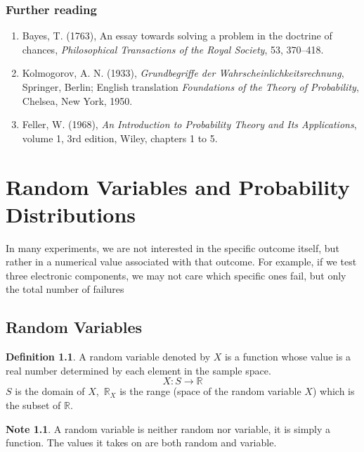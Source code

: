 \documentclass[12pt,a4paper]{report}
\theoremstyle{definition}
\newtheorem{definition}[thm]{Definition}
\newtheorem{note}[thm]{Note}
\theoremstyle{plain}
\theoremstyle{definition}
\begin{document}
\subsection*{Further reading}
\begin{enumerate}
\item Bayes, T. (1763), An essay towards solving a problem in the doctrine of chances,
\emph{Philosophical Transactions of the Royal Society}, 53, 370--418.
\item Kolmogorov, A. N. (1933), \emph{Grundbegriffe der Wahrscheinlichkeitsrechnung},
Springer, Berlin; English translation \emph{Foundations of the Theory of Probability},
Chelsea, New York, 1950.
\item Feller, W. (1968), \emph{An Introduction to Probability Theory and Its
Applications}, volume 1, 3rd edition, Wiley, chapters 1 to 5.
\end{enumerate}


\chapter{Random Variables and Probability Distributions}
\label{ch:randomvariables}
\vspace{-15pt}
In many experiments, we are not interested in the specific outcome itself, but rather in a numerical value associated with that outcome. For example, if we test three electronic components, we may not care which specific ones fail, but only the total number of failures


\section{Random Variables}
\begin{definition}
A random variable denoted by $X$ is a function whose value is a real number determined by each element in the sample space.
\[X:S\longrightarrow \mathbb{R}\]
$S$ is the domain of $X$, $\, \mathbb{R}_X$ is the range (space of the random variable $X$) which is the subset of $\mathbb{R}$.
\end{definition}


\begin{note}
A random variable is neither random nor variable, it is simply a function.
The values it takes on are both random and variable.
\end{note}
\end{document}
